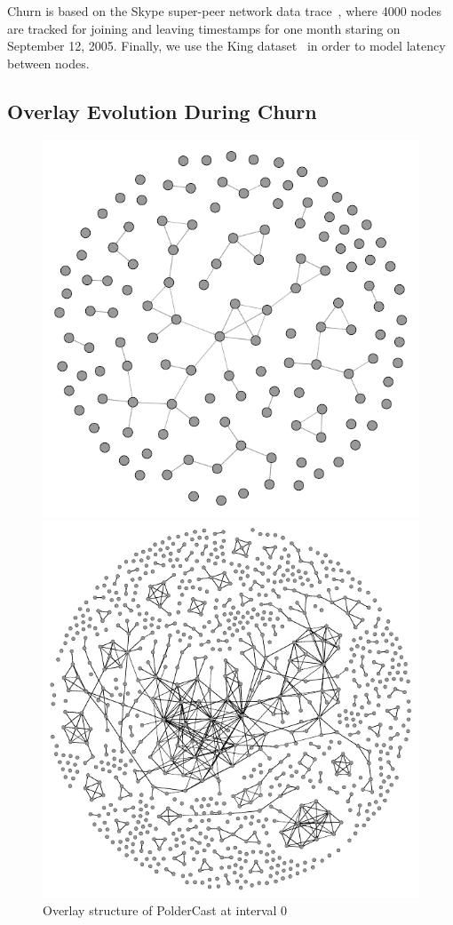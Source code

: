 Churn is based on the Skype super-peer network data
trace~\cite{Guha:2006}, where 4000 nodes are tracked for joining and
leaving timestamps for one month staring on September 12, 2005. Finally,
we use the King dataset~\cite{king} in order to model latency between
nodes.

\subsection{Overlay Evolution During Churn}
\label{sec:churn}

\afterpage{\clearpage}
\begin{figure}[H]
    \vspace{-100pt}
    \centering
    \includegraphics[scale=0.5]{figures/churn_0}
    \caption{Overlay structure of PolderCast at interval 0}
    \label{fig:churn0}
    \includegraphics[scale=1]{figures/churn_250}

\end{figure}
